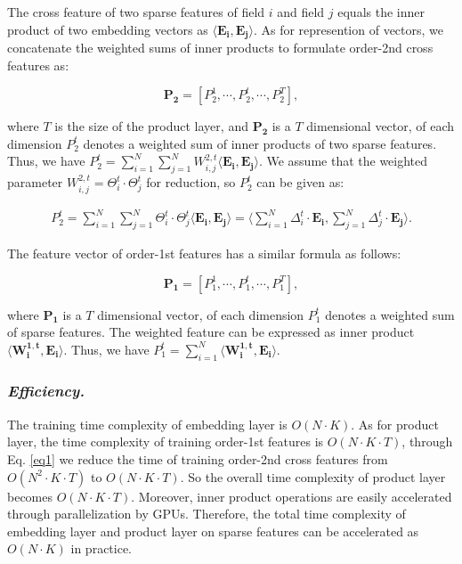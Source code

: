 \documentclass[letterpaper]{article} \usepackage{aaai21}  \usepackage{times}  \usepackage{helvet} \usepackage{courier}  \usepackage[hyphens]{url}  \usepackage{graphicx} \urlstyle{rm} \def\UrlFont{\rm}  \usepackage{natbib}  \usepackage{caption} \frenchspacing  \setlength{\pdfpagewidth}{8.5in}  \setlength{\pdfpageheight}{11in}  \usepackage{graphicx}
\begin{document}
The cross feature of two sparse features of field $i$ and field $j$ equals the inner product of two embedding vectors as $\langle \bm{E_i}, \bm{E_j} \rangle$. As for represention of vectors, we concatenate the weighted sums of inner products to formulate order-2nd cross features as: 
\begin{small}
\begin{equation}
\bm{P_2} = [P_2^1, \cdots, P_2^t, \cdots, P_2^T],
\end{equation}
\end{small}where $T$ is the size of the product layer, and $\bm{P_2}$ is a $T$ dimensional vector, of each dimension $P_2^t$ denotes a weighted sum of inner products of two sparse features. Thus, we have $P_2^t = \sum_{i=1}^{N} \sum_{j=1}^{N} W^{2,t}_{i,j} \langle \bm{E_i}, \bm{E_j} \rangle $. We assume that the weighted parameter $W^{2,t}_{i,j} = \Theta_{i}^{t} \cdot \Theta_{j}^{t}$ for reduction, so $P_2^t$ can be given as: 
\begin{small}
\begin{equation}
\begin{aligned}
P_2^t= \sum_{i=1}^{N} \sum_{j=1}^{N} \Theta_{i}^{t} \cdot \Theta_{j}^{t} \langle \bm{E_i}, \bm{E_j} \rangle
= \bigg\langle \sum_{i=1}^{N} \Delta_{i}^{t} \cdot \bm{E_i}, \sum_{j=1}^{N} \Delta_{j}^{t} \cdot \bm{E_j} \bigg\rangle.
\end{aligned}
\label{eq1}
\end{equation}
\end{small}The feature vector of order-1st features has a similar formula as follows: 
\begin{small}
\begin{equation}
\bm{P_1} = [P_1^1, \cdots, P_1^t, \cdots, P_1^T],
\end{equation}
\end{small}where $\bm{P_1}$ is a $T$ dimensional vector, of each dimension $P_1^t$ denotes a weighted sum of sparse features. The weighted feature can be expressed as inner product $\langle \bm{W^{1,t}_{i}}, \bm{E_i} \rangle$. Thus, we have $P_1^t = \sum_{i=1}^{N} \langle \bm{W^{1,t}_{i}}, \bm{E_i} \rangle$. 

\vspace{-0.1cm}
\subsubsection{{\em Efficiency.}} The training time complexity of embedding layer is $O(N \cdot K)$. As for product layer, the time complexity of training order-1st features is $O(N \cdot K \cdot T)$, through Eq. \ref{eq1} we reduce the time of training order-2nd cross features from $O(N^2  \cdot K \cdot T)$ to $O(N \cdot K \cdot T)$. So the overall time complexity of product layer becomes $O(N \cdot K \cdot T)$.  Moreover, inner product operations are easily accelerated through parallelization by GPUs. Therefore, the total time complexity of embedding layer and product layer on sparse features can be accelerated as $O(N \cdot K)$ in practice.
\end{document}
